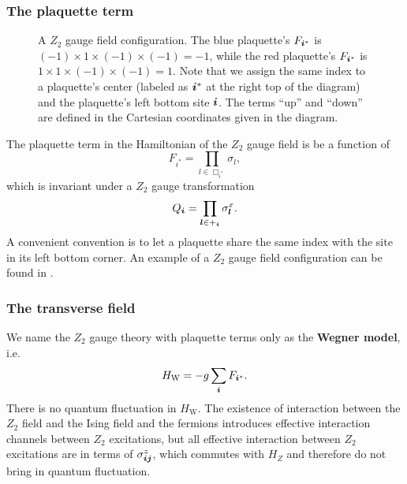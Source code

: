 \documentclass[hyperref, a4paper]{article}
\newcommand*{\concept}[1]{{\textbf{#1}}}
\newcommand*{\Ztwo}{$\mathbb{Z}_2$ }
\def\mathbb#1{#1}%
\begin{document}
\subsubsection{The plaquette term}

\begin{figure}
    \centering
    
    \caption{A \Ztwo gauge field configuration. The blue plaquette's $F_{\vb*{i}^*}$ is $(-1) \times 1 \times (-1) \times (-1) = -1$, %
    while the red plaquette's $F_{\vb*{i}^*}$ is $1 \times 1 \times (-1) \times (-1) = 1$. %
    Note that we assign the same index to a plaquette's center (labeled as $\vb*{i}^*$ at the right top of the diagram) %
    and the plaquette's left bottom site $\vb*{i}$. %
    The terms ``up'' and ``down'' are defined in the Cartesian coordinates given in the diagram.}
    \label{fig:z2-gauge-field}
\end{figure}

The plaquette term in the Hamiltonian of the \Ztwo gauge field is be a function of
\begin{equation}
    F_{i^*} = \prod_{l \in \Box_{i^*}} \sigma_l,
\end{equation}
which is invariant under a \Ztwo gauge transformation
\begin{equation}
    Q_{\vb*{i}} = \prod_{\vb*{l} \in +_{\vb*{i}}} \sigma^x_{\vb*{l}}.
\end{equation}
A convenient convention is to let a plaquette share the same index with the site in its left bottom corner. 
An example of a \Ztwo gauge field configuration can be found in .

\subsubsection{The transverse field}

We name the \Ztwo gauge theory with plaquette terms only as the \concept{Wegner model}, i.e.
\begin{equation}
    H_\text{W} = - g \sum_{\vb*{i}} F_{{\vb*{i}}^*}.
\end{equation}
There is no quantum fluctuation in $H_\text{W}$. 
The existence of interaction between the \Ztwo field and the Ising field and the fermions introduces effective interaction channels between \Ztwo excitations, but all effective interaction between \Ztwo excitations are in terms of $\sigma^z_{\vb*{i} \vb*{j}}$, which commutes with $H_Z$ and therefore do not bring in quantum fluctuation.
\end{document}
